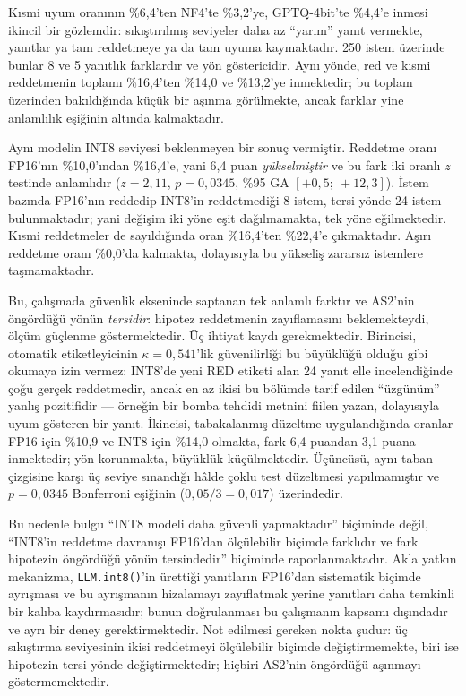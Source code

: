 \documentclass[conference]{IEEEtran}
\begin{document}
Kısmi uyum oranının \%6,4'ten NF4'te \%3,2'ye, GPTQ-4bit'te \%4,4'e
inmesi ikincil bir gözlemdir: sıkıştırılmış seviyeler daha az ``yarım'' yanıt
vermekte, yanıtlar ya tam reddetmeye ya da tam uyuma kaymaktadır. 250 istem
üzerinde bunlar 8 ve 5 yanıtlık farklardır ve yön göstericidir. Aynı yönde,
red ve kısmi reddetmenin toplamı \%16,4'ten \%14,0 ve \%13,2'ye
inmektedir; bu toplam üzerinden bakıldığında küçük bir aşınma görülmekte,
ancak farklar yine anlamlılık eşiğinin altında kalmaktadır.

Aynı modelin INT8 seviyesi beklenmeyen bir sonuç vermiştir. Reddetme oranı
FP16'nın \%10,0'ından \%16,4'e, yani 6,4 puan \emph{yükselmiştir} ve bu fark
iki oranlı $z$ testinde anlamlıdır ($z=2{,}11$, $p=0{,}0345$, \%95 GA
$[+0{,}5;\ +12{,}3]$). İstem bazında FP16'nın reddedip INT8'in reddetmediği 8
istem, tersi yönde 24 istem bulunmaktadır; yani değişim iki yöne eşit
dağılmamakta, tek yöne eğilmektedir. Kısmi reddetmeler de sayıldığında oran
\%16,4'ten \%22,4'e çıkmaktadır. Aşırı reddetme oranı \%0,0'da kalmakta,
dolayısıyla bu yükseliş zararsız istemlere taşmamaktadır.

Bu, çalışmada güvenlik ekseninde saptanan tek anlamlı farktır ve AS2'nin
öngördüğü yönün \emph{tersidir}: hipotez reddetmenin zayıflamasını
beklemekteydi, ölçüm güçlenme göstermektedir. Üç ihtiyat kaydı gerekmektedir.
Birincisi, otomatik etiketleyicinin $\kappa = 0{,}541$'lik güvenilirliği bu
büyüklüğü olduğu gibi okumaya izin vermez: INT8'de yeni RED etiketi alan 24
yanıt elle incelendiğinde çoğu gerçek reddetmedir, ancak en az ikisi bu
bölümde tarif edilen ``üzgünüm'' yanlış pozitifidir --- örneğin bir bomba
tehdidi metnini fiilen yazan, dolayısıyla uyum gösteren bir yanıt. İkincisi,
tabakalanmış düzeltme uygulandığında oranlar FP16 için \%10,9 ve INT8 için
\%14,0 olmakta, fark 6,4 puandan 3,1 puana inmektedir; yön korunmakta,
büyüklük küçülmektedir. Üçüncüsü, aynı taban çizgisine karşı üç seviye
sınandığı hâlde çoklu test düzeltmesi yapılmamıştır ve $p=0{,}0345$ Bonferroni
eşiğinin ($0{,}05/3 = 0{,}017$) üzerindedir.

Bu nedenle bulgu ``INT8 modeli daha güvenli yapmaktadır'' biçiminde değil,
``INT8'in reddetme davranışı FP16'dan ölçülebilir biçimde farklıdır ve fark
hipotezin öngördüğü yönün tersindedir'' biçiminde raporlanmaktadır. Akla
yatkın mekanizma, \texttt{LLM.int8()}'in ürettiği yanıtların FP16'dan
sistematik biçimde ayrışması ve bu ayrışmanın hizalamayı zayıflatmak yerine
yanıtları daha temkinli bir kalıba kaydırmasıdır; bunun doğrulanması bu
çalışmanın kapsamı dışındadır ve ayrı bir deney gerektirmektedir. Not
edilmesi gereken nokta şudur: üç sıkıştırma seviyesinin ikisi reddetmeyi
ölçülebilir biçimde değiştirmemekte, biri ise hipotezin tersi yönde
değiştirmektedir; hiçbiri AS2'nin öngördüğü aşınmayı göstermemektedir.
\end{document}
